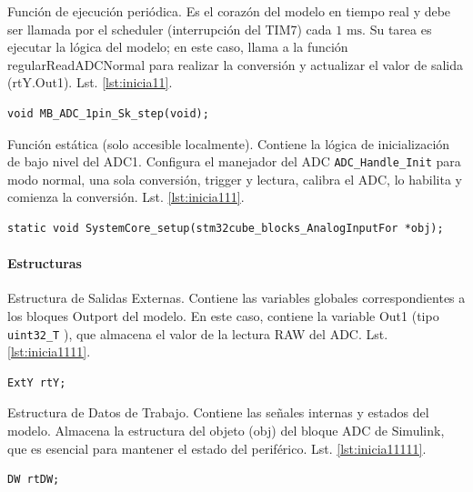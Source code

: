 Función de ejecución periódica. Es el corazón del modelo en tiempo real y debe ser llamada por el scheduler (interrupción del TIM7) cada $1\text{ ms}$. Su tarea es ejecutar la lógica del modelo; en este caso, llama a la función regularReadADCNormal para realizar la conversión y actualizar el valor de salida (rtY.Out1). Lst. \ref{lst:inicia11}. \\

\begin{minipage}{\textwidth}
	\begin{lstlisting}[caption={Función de ejecución periódica}, label={lst:inicia11}]
	void MB_ADC_1pin_Sk_step(void);
	\end{lstlisting}
\end{minipage}		

Función estática (solo accesible localmente). Contiene la lógica de inicialización de bajo nivel del ADC1. Configura el manejador del ADC \texttt{ADC\_Handle\_Init} para modo normal, una sola conversión, trigger y lectura, calibra el ADC, lo habilita y comienza la conversión. Lst. \ref{lst:inicia111}.\\

\begin{minipage}{\textwidth}
	\begin{lstlisting}[caption={Inicialización del ADC1}, label={lst:inicia111}]
	static void SystemCore_setup(stm32cube_blocks_AnalogInputFor *obj);
	\end{lstlisting}
\end{minipage}	

\paragraph{Estructuras}
Estructura de Salidas Externas. Contiene las variables globales correspondientes a los bloques Outport del modelo. En este caso, contiene la variable Out1 (tipo \texttt{uint32\_T} ), que almacena el valor de la lectura RAW del ADC. Lst. \ref{lst:inicia1111}. \\
\begin{minipage}{\textwidth}
	\begin{lstlisting}[caption={Estructura de salidas externas}, label={lst:inicia1111}]
	ExtY rtY;
	\end{lstlisting}
\end{minipage}	
Estructura de Datos de Trabajo. Contiene las señales internas y estados del modelo. Almacena la estructura del objeto (obj) del bloque ADC de Simulink, que es esencial para mantener el estado del periférico. Lst. \ref{lst:inicia11111}. \\
\begin{minipage}{\textwidth}
	\begin{lstlisting}[caption={Estados internos del modelo}, label={lst:inicia11111}]
	DW rtDW;
	\end{lstlisting}
\end{minipage}	


